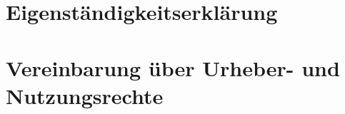 \section{Eigenständigkeitserklärung}
\newpage

\section{Vereinbarung über Urheber- und Nutzungs\-rechte}
